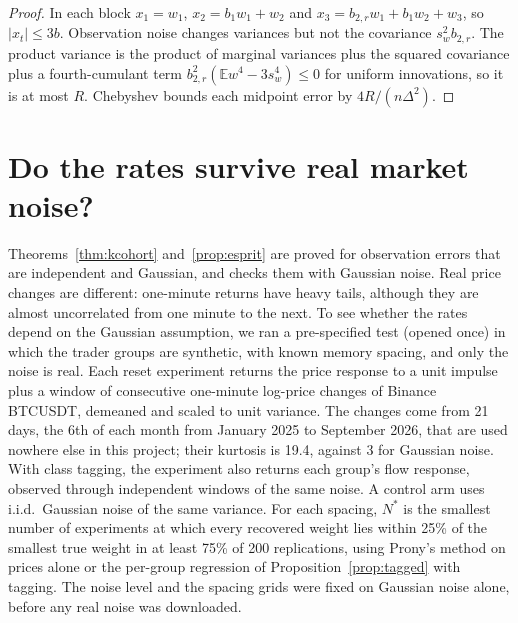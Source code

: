\documentclass[12pt]{article}
\theoremstyle{definition}
\theoremstyle{remark}
\newcommand{\E}{\mathbb{E}}
\begin{document}
\begin{proof} In each block $x_1=w_1$, $x_2=b_1w_1+w_2$ and $x_3=b_{2,r}w_1+b_1w_2+w_3$, so $|x_t|\le3b$. Observation noise changes variances but not the covariance $s_w^2b_{2,r}$. The product variance is the product of marginal variances plus the squared covariance plus a fourth-cumulant term $b_{2,r}^2(\E w^4-3s_w^4)\le0$ for uniform innovations, so it is at most $R$. Chebyshev bounds each midpoint error by $4R/(n\Delta^2)$.
\end{proof}

\section{Do the rates survive real market noise?}\label{sec:injection}

Theorems~\ref{thm:kcohort} and~\ref{prop:esprit} are proved for observation errors that are independent and Gaussian, and \citet{niroula2026a} checks them with Gaussian noise. Real price changes are different: one-minute returns have heavy tails, although they are almost uncorrelated from one minute to the next. To see whether the rates depend on the Gaussian assumption, we ran a pre-specified test (opened once) in which the trader groups are synthetic, with known memory spacing, and only the noise is real. Each reset experiment returns the price response to a unit impulse plus a window of consecutive one-minute log-price changes of Binance BTCUSDT, demeaned and scaled to unit variance. The changes come from 21 days, the 6th of each month from January 2025 to September 2026, that are used nowhere else in this project; their kurtosis is 19.4, against 3 for Gaussian noise. With class tagging, the experiment also returns each group's flow response, observed through independent windows of the same noise. A control arm uses i.i.d.\ Gaussian noise of the same variance. For each spacing, $N^*$ is the smallest number of experiments at which every recovered weight lies within 25\% of the smallest true weight in at least 75\% of 200 replications, using Prony's method on prices alone or the per-group regression of Proposition~\ref{prop:tagged} with tagging. The noise level and the spacing grids were fixed on Gaussian noise alone, before any real noise was downloaded.
\end{document}
